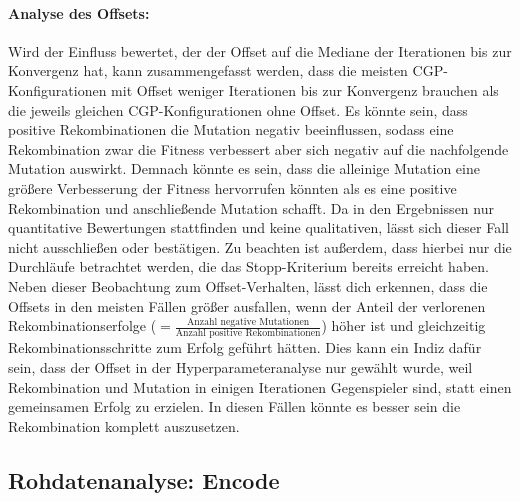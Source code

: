 \paragraph{Analyse des Offsets:}
Wird der Einfluss bewertet, der der Offset auf die Mediane der Iterationen bis zur Konvergenz hat, kann zusammengefasst werden, dass die meisten CGP-Konfigurationen mit Offset weniger Iterationen bis zur Konvergenz brauchen als die jeweils gleichen CGP-Konfigurationen ohne Offset.
Es könnte sein, dass positive Rekombinationen die Mutation negativ beeinflussen, sodass eine Rekombination zwar die Fitness verbessert aber sich negativ auf die nachfolgende Mutation auswirkt.
Demnach könnte es sein, dass die alleinige Mutation eine größere Verbesserung der Fitness hervorrufen könnten als es eine positive Rekombination und anschließende Mutation schafft.
Da in den Ergebnissen nur quantitative Bewertungen stattfinden und keine qualitativen, lässt sich dieser Fall nicht ausschließen oder bestätigen.
Zu beachten ist außerdem, dass hierbei nur die Durchläufe betrachtet werden, die das Stopp-Kriterium bereits erreicht haben.\\
Neben dieser Beobachtung zum Offset-Verhalten, lässt dich erkennen, dass die Offsets in den meisten Fällen größer ausfallen, wenn der Anteil der verlorenen Rekombinationserfolge ($= \frac{\text{Anzahl negative Mutationen}}{\text{Anzahl positive Rekombinationen}}$) höher ist und gleichzeitig Rekombinationsschritte zum Erfolg geführt hätten.
Dies kann ein Indiz dafür sein, dass der Offset in der Hyperparameteranalyse nur gewählt wurde, weil Rekombination und Mutation in einigen Iterationen Gegenspieler sind, statt einen gemeinsamen Erfolg zu erzielen. In diesen Fällen könnte es besser sein die Rekombination komplett auszusetzen.


\subsection{Rohdatenanalyse: Encode}
\label{subsec:rohdatenEncode}

